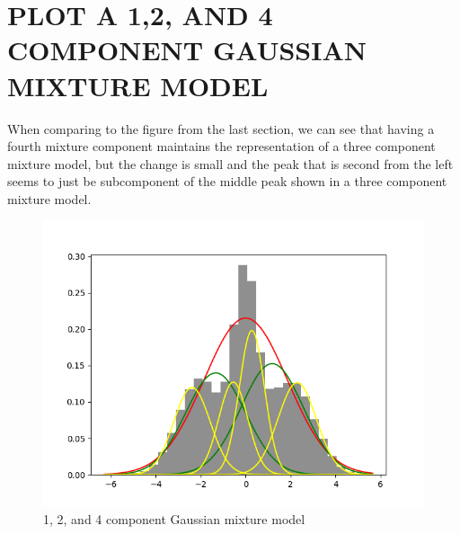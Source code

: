 \documentclass{article}
\begin{document}
\section{\MakeUppercase{Plot a 1,2, and 4 component Gaussian mixture model}}
When comparing to the figure from the last section, we can see that having a fourth mixture component maintains the representation of a three component mixture model, but the change is small and the peak that is second from the left seems to just be subcomponent of the middle peak shown in a three component mixture model.
\begin{figure}[!htb]
	\centering
	\begin{minipage}{0.49\textwidth}
			\centering
			\includegraphics[width=1\linewidth]{../q1to6pics/q3.png}
			\caption{1, 2, and 4 component Gaussian mixture model}
	\end{minipage}\hfill
\end{figure}
\pagebreak
\end{document}
